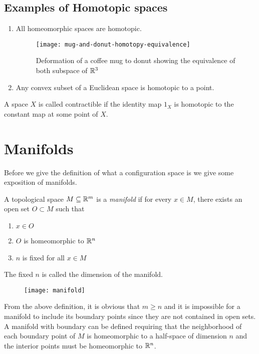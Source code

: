 \subsection*{Examples of Homotopic spaces}
\begin{enumerate}
\item All homeomorphic spaces are homotopic.
\begin{figure}[H]
    \centering
    \texttt{[image: mug-and-donut-homotopy-equivalence]}
    \caption{Deformation of a coffee mug to donut showing the equivalence of both subspace of $\mathbb{R}^3$}
\end{figure}
\item Any convex subset of a Euclidean space is homotopic to a point.
\end{enumerate}



\begin{defn}
A space $X$ is called contractible if the identity map $1_X$ is homotopic to the constant map at some point of $X$.
\end{defn}

\section{Manifolds}
Before we give the definition of what a configuration space is we give some exposition of manifolds.
\begin{defn}[Manifold]
    A topological space $M \subseteq \mathbb{R}^m$ is a \textit{manifold} if for every $x \in M$, there exists an open set $O \subset M$ such that 
    \begin{enumerate}
        \item $x \in O$
        \item $O$ is homeomorphic to $\mathbb{R}^n$
        \item $n$ is fixed for all $x \in M$
    \end{enumerate}
    The fixed $n$ is called the dimension of the manifold.
    \begin{figure}[H]
        \centering
        \texttt{[image: manifold]}
    \end{figure}
\end{defn}

From the above definition, it is obvious that $m \ge n$ and it is impossible for a manifold to include its boundary points since they are not contained in open sets.
\linebreak
A manifold with boundary can be defined requiring that the neighborhood of each boundary point of $M$ is homeomorphic to a half-space of dimension $n$ and the interior points must be homeomorphic to $\mathbb{R}^n$.

